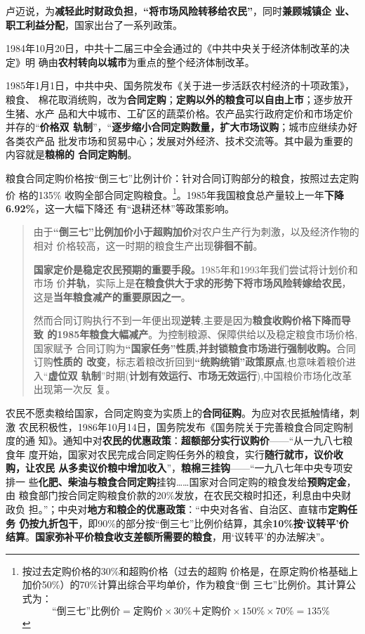 卢迈说，为\textbf{减轻此时财政负担}，\textbf{“将市场风险转移给农民”}，同时\textbf{兼顾城镇企
  业、职工利益分配}，国家出台了一系列政策。

1984年10月20日，中共十二届三中全会通过的《中共中央关于经济体制改革的决定》明
确由\textbf{农村转向以城市}为重点的整个经济体制改革。

1985年1月1日，中共中央、国务院发布《关于进一步活跃农村经济的十项政策》，粮食、
棉花取消统购，改为\textbf{合同定购}；\textbf{定购以外的粮食可以自由上市}；逐步放开生猪、水产
品和大中城市、工矿区的蔬菜价格。农产品实行政府定价和市场定价并存的“\textbf{价格双
  轨制}”，“\textbf{逐步缩小合同定购数量，扩大市场议购}；城市应继续办好各类农产品
批发市场和贸易中心；发展对外经济、技术交流等。其中最为重要的内容就是\textbf{粮棉的
  合同定购制}。

粮食合同定购价格按“倒三七”比例计价：针对合同订购部分的粮食，按照过去定购价
格的135\% 收购全部合同定购粮食。\footnote{按过去定购价格的30\%和超购价格（过去的超购
  价格是，在原定购价格基础上加价50\%）的70\%计算出综合平均单价，作为粮食“倒
  三七”比例价。其计算公式为：
  \[ “倒三七”比例价 = 定购价 \times 30\% ＋ 定购价 \times 150\% \times 70\% =
    135\%\]}。1985年我国粮食总产量较上一年\textbf{下降6.92\%}，这一大幅下降还
有“退耕还林”等政策影响。

\begin{quotation}
  由于\textbf{“倒三七”比例加价小于超购加价}对农户生产行为刺激，以及经济作物的相对
  价格较高，这一时期的粮食生产出现\textbf{徘徊不前}。\cite{shuangguizhi}

  \textbf{国家定价是稳定农民预期的重要手段。}1985年和1993年我们尝试将计划价和市场
  价\textbf{并轨}，实际上是\textbf{在粮食供大于求的形势下将市场风险转嫁给农民}，
  这是\textbf{当年粮食减产的重要原因之一}。\cite{lumaisg}

  然而合同订购执行不到一年便出现\textbf{逆转},主要是因为\textbf{粮食收购价格下降而导致
    的1985年粮食大幅减产}。为控制粮源、保障供给以及稳定粮食市场价格,国家赋予
  合同订购为\textbf{“国家任务”性质,并封锁粮食市场进行强制收购。}合同订购\textbf{性质的
    改变}，标志着粮改折回到\textbf{“统购统销”政策原点},也意味着粮价进入“\textbf{虚位双
    轨制}”时期(\textbf{计划有效运行、市场无效运行}),中国粮价市场化改革出现第一次反
  复。\cite{liangshi40}
\end{quotation}

农民不愿卖粮给国家，合同定购变为实质上的\textbf{合同征购}。为应对农民抵触情绪，刺激
农民积极性，1986年10月14日，国务院发布《国务院关于完善粮食合同定购制度的通
知》。通知中对\textbf{农民的优惠政策}：\textbf{超额部分实行议购价}——“从一九八七粮食年
度开始，国家对农民完成合同定购任务外的粮食，实行\textbf{随行就市，议价收购，让农民
  从多卖议价粮中增加收入}”，\textbf{粮棉三挂钩}——“一九八七年中央专项安排一
些\textbf{化肥、柴油与粮食合同定购}挂钩……国家对合同定购的粮食发给\textbf{预购定金}，由
粮食部门按合同定购粮食价款的20\%发放，在农民交粮时扣还，利息由中央财政负
担。”；中央对\textbf{地方和粮企的优惠政策}：“中央对各省、自治区、直辖市\textbf{定购任务
  仍按九折包干}，即90\%的部分按“倒三七”比例价结算，其余\textbf{10\%按‘议转平’价
  结算}。\textbf{国家弥补平价粮食收支差额所需要的粮食}，用‘议转平’的办法解决”。

